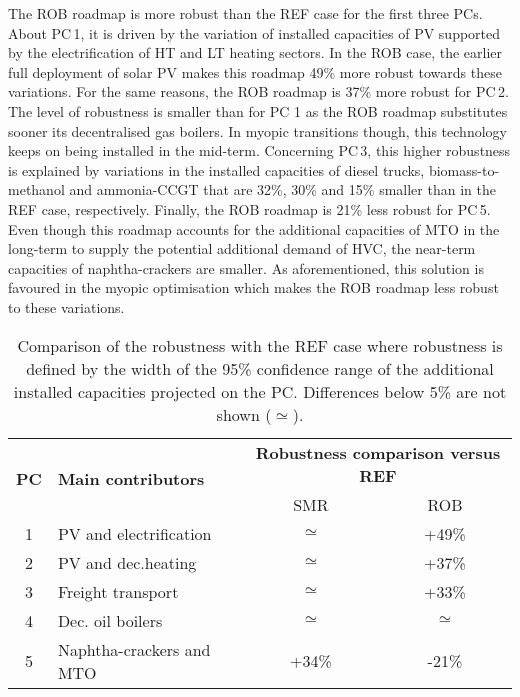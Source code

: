 The ROB roadmap is more robust than the REF case for the first three PCs. About PC\,1, it is driven by the variation of installed capacities of \gls{PV} supported by the electrification of \gls{HT} and \gls{LT} heating sectors. In the ROB case, the earlier full deployment of solar \gls{PV} makes this roadmap 49\% more robust towards these variations. For the same reasons, the ROB roadmap is 37\% more robust for PC\,2. The level of robustness is smaller than for PC 1 as the ROB roadmap substitutes sooner its decentralised gas boilers. In myopic transitions though, this technology keeps on being installed in the mid-term. Concerning PC\,3, this higher robustness is explained by variations in the installed capacities of diesel trucks, biomass-to-methanol and ammonia-\gls{CCGT} that are 32\%, 30\% and 15\% smaller than in the REF case, respectively.  Finally, the ROB roadmap is 21\% less robust for PC\,5. Even though this roadmap accounts for the additional capacities of \gls{MTO} in the long-term to supply the potential additional demand of \gls{HVC}, the near-term capacities of naphtha-crackers are smaller. As aforementioned, this solution is favoured in the myopic optimisation which makes the ROB roadmap less robust to these variations.

\begin{table}[htbp!]
\caption{Comparison of the robustness with the REF case where robustness is defined by the width of the 95\% confidence range of the additional installed capacities projected on the PC. Differences below 5\% are not shown ($\simeq$).}
\label{tab:projection}
\centering
\begin{tabular}{c l| c c}
\toprule
\multirow{2}{*}{\textbf{PC}} & \multirow{2}{*}{\textbf{Main contributors}} & \multicolumn{2}{c}{\textbf{Robustness comparison versus REF}}\\
& & SMR & ROB \\
\midrule
1 & \gls{PV} and electrification & $\simeq$ & +49\% \\
2 & \gls{PV} and dec.heating & $\simeq$ & +37\%\\
3 & Freight transport & $\simeq$ & +33\%\\
4 & Dec. oil boilers & $\simeq$ & $\simeq$ \\
5 &  Naphtha-crackers and \gls{MTO} & +34\% & -21\%\\
\bottomrule							
\end{tabular}
\end{table}

